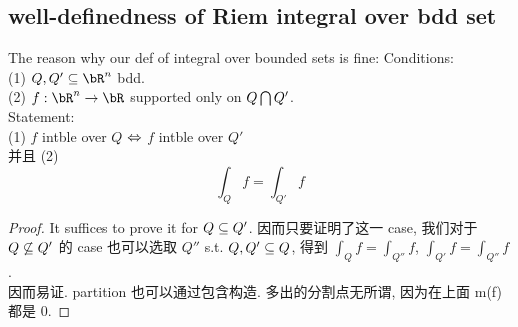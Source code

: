 \documentclass[lang=cn,11pt]{elegantbook}
\begin{document}
\subsection{well-definedness of Riem integral over bdd set}
\begin{lemma}{The reason why our def of integral over bounded sets is fine:}
    Conditions:\\
    (1) $Q, Q' \sub \bR^n$ bdd.\\
    (2) $f: \bR^n \rar \bR$ supported only on $Q \bigcap Q'$.\\
    Statement:\\
    (1) $f$ intble over $Q$ $\Leftrightarrow$ $f$ intble over $Q'$ \\
    并且 (2)
    $$
    \int_Q f = \int_{Q'} f 
    $$
\end{lemma}
\begin{proof}
    It suffices to prove it for $Q \subseteq Q'$. 因而只要证明了这一 case, 我们对于 $Q \not \subseteq Q'$ 的 case 也可以选取 $Q''$ s.t. $Q, Q' \subseteq Q$, 得到 $\int_Q f = \int_{Q''}f$, $\int_{Q'} f = \int_{Q''} f$.\\
    因而易证. partition 也可以通过包含构造. 多出的分割点无所谓, 因为在上面 m(f) 都是 0.
\end{proof}
\end{document}
